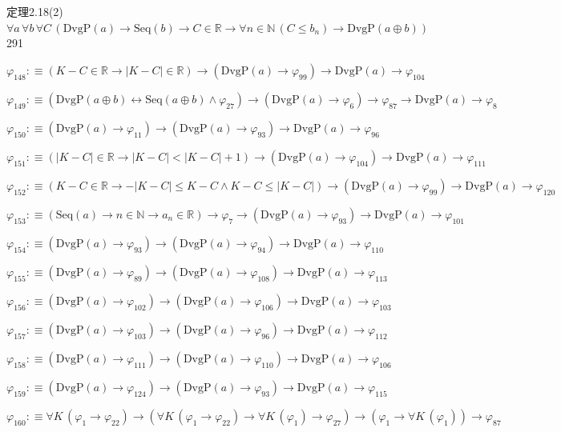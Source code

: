 \begin{fullproof}{定理2.18(2)}{$\forall a\,\forall b\,\forall C\,(\mathrm{DvgP}(a) \to \mathrm{Seq}(b) \to C \in \mathbb{R} \to \forall n \in \mathbb{N}\,(C \leq b_{n}) \to \mathrm{DvgP}(a \oplus b))$}{291}
\begin{abbrevlist}
\item $\varphi_{148} :\equiv (K - C \in \mathbb{R} \to \lvert K - C \rvert \in \mathbb{R}) \to (\mathrm{DvgP}(a) \to \varphi_{99}) \to \mathrm{DvgP}(a) \to \varphi_{104}$
\item $\varphi_{149} :\equiv (\mathrm{DvgP}(a \oplus b) \leftrightarrow \mathrm{Seq}(a \oplus b) \land \varphi_{27}) \to (\mathrm{DvgP}(a) \to \varphi_{6}) \to \varphi_{87} \to \mathrm{DvgP}(a) \to \varphi_{8}$
\item $\varphi_{150} :\equiv (\mathrm{DvgP}(a) \to \varphi_{11}) \to (\mathrm{DvgP}(a) \to \varphi_{93}) \to \mathrm{DvgP}(a) \to \varphi_{96}$
\item $\varphi_{151} :\equiv (\lvert K - C \rvert \in \mathbb{R} \to \lvert K - C \rvert < \lvert K - C \rvert + 1) \to (\mathrm{DvgP}(a) \to \varphi_{104}) \to \mathrm{DvgP}(a) \to \varphi_{111}$
\item $\varphi_{152} :\equiv (K - C \in \mathbb{R} \to -\lvert K - C \rvert \leq K - C \land K - C \leq \lvert K - C \rvert) \to (\mathrm{DvgP}(a) \to \varphi_{99}) \to \mathrm{DvgP}(a) \to \varphi_{120}$
\item $\varphi_{153} :\equiv (\mathrm{Seq}(a) \to n \in \mathbb{N} \to a_{n} \in \mathbb{R}) \to \varphi_{7} \to (\mathrm{DvgP}(a) \to \varphi_{93}) \to \mathrm{DvgP}(a) \to \varphi_{101}$
\item $\varphi_{154} :\equiv (\mathrm{DvgP}(a) \to \varphi_{93}) \to (\mathrm{DvgP}(a) \to \varphi_{94}) \to \mathrm{DvgP}(a) \to \varphi_{110}$
\item $\varphi_{155} :\equiv (\mathrm{DvgP}(a) \to \varphi_{89}) \to (\mathrm{DvgP}(a) \to \varphi_{108}) \to \mathrm{DvgP}(a) \to \varphi_{113}$
\item $\varphi_{156} :\equiv (\mathrm{DvgP}(a) \to \varphi_{102}) \to (\mathrm{DvgP}(a) \to \varphi_{106}) \to \mathrm{DvgP}(a) \to \varphi_{103}$
\item $\varphi_{157} :\equiv (\mathrm{DvgP}(a) \to \varphi_{103}) \to (\mathrm{DvgP}(a) \to \varphi_{96}) \to \mathrm{DvgP}(a) \to \varphi_{112}$
\item $\varphi_{158} :\equiv (\mathrm{DvgP}(a) \to \varphi_{111}) \to (\mathrm{DvgP}(a) \to \varphi_{110}) \to \mathrm{DvgP}(a) \to \varphi_{106}$
\item $\varphi_{159} :\equiv (\mathrm{DvgP}(a) \to \varphi_{124}) \to (\mathrm{DvgP}(a) \to \varphi_{93}) \to \mathrm{DvgP}(a) \to \varphi_{115}$
\item $\varphi_{160} :\equiv \forall K\,(\varphi_{1} \to \varphi_{22}) \to (\forall K\,(\varphi_{1} \to \varphi_{22}) \to \forall K\,(\varphi_{1}) \to \varphi_{27}) \to (\varphi_{1} \to \forall K\,(\varphi_{1})) \to \varphi_{87}$

\end{abbrevlist}
\end{fullproof}
